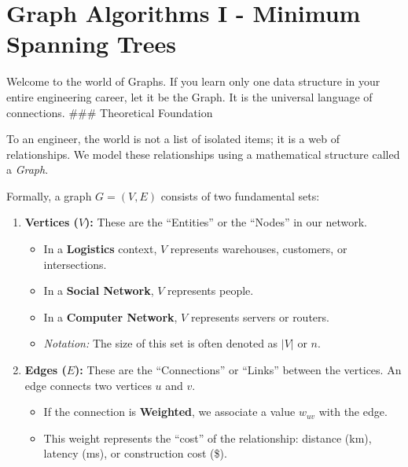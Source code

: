 \documentclass[
  letterpaper,
  DIV=11,
  numbers=noendperiod]{scrreprt}
\providecommand{\tightlist}{%
  \setlength{\itemsep}{0pt}\setlength{\parskip}{0pt}}
\begin{document}
\section{Graph Algorithms I - Minimum Spanning
Trees}\label{graph-algorithms-i---minimum-spanning-trees}

Welcome to the world of Graphs. If you learn only one data structure in
your entire engineering career, let it be the Graph. It is the universal
language of connections. \#\#\# Theoretical Foundation

To an engineer, the world is not a list of isolated items; it is a web
of relationships. We model these relationships using a mathematical
structure called a \emph{Graph}.

Formally, a graph \(G = (V, E)\) consists of two fundamental sets:

\begin{enumerate}
\def\labelenumi{\arabic{enumi}.}
\item
  \textbf{Vertices (\(V\)):} These are the ``Entities'' or the ``Nodes''
  in our network.

  \begin{itemize}
  \tightlist
  \item
    In a \textbf{Logistics} context, \(V\) represents warehouses,
    customers, or intersections.
  \item
    In a \textbf{Social Network}, \(V\) represents people.
  \item
    In a \textbf{Computer Network}, \(V\) represents servers or routers.
  \item
    \emph{Notation:} The size of this set is often denoted as \(|V|\) or
    \(n\).
  \end{itemize}
\item
  \textbf{Edges (\(E\)):} These are the ``Connections'' or ``Links''
  between the vertices. An edge connects two vertices \(u\) and \(v\).

  \begin{itemize}
  \tightlist
  \item
    If the connection is \textbf{Weighted}, we associate a value
    \(w_{uv}\) with the edge.
  \item
    This weight represents the ``cost'' of the relationship: distance
    (km), latency (ms), or construction cost (\$).
  \end{itemize}
\end{enumerate}
\end{document}

